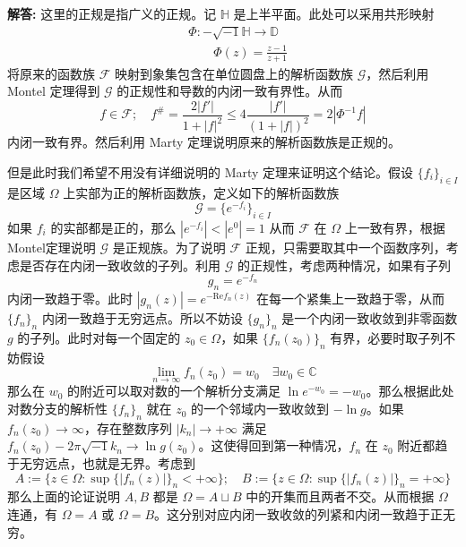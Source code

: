 \documentclass[12pt, a4paper, oneside]{ctexart}
\newcommand{\C}{\mathbb{C}}
\newcommand{\re}{\mathrm{Re}}
\newenvironment{solution}{\par\noindent\textbf{解答:}}{\par}
\begin{document}
\begin{solution}
    这里的正规是指广义的正规。记 $\mathbb{H}$ 是上半平面。此处可以采用共形映射
    \begin{align*}
        &   \Phi:-\sqrt{-1}\mathbb{H} \to \mathbb{D}\\
        &   \qquad \Phi(z) = \frac{z-1}{z+1}
    \end{align*}
    将原来的函数族 $\mathcal{F}$ 映射到象集包含在单位圆盘上的解析函数族 $\mathcal{G}$，然后利用 Montel 定理得到 $\mathcal{G}$ 的正规性和导数的内闭一致有界性。从而
    \begin{equation*}
        f \in \mathcal{F};\quad f^{\#} = \frac{2|f'|}{1+|f|^{2}} \le 4\frac{|f'|}{(1+|f|)^{2}} = 2|\Phi^{-1}f|
    \end{equation*}
    内闭一致有界。然后利用 Marty 定理说明原来的解析函数族是正规的。

    但是此时我们希望不用没有详细说明的 Marty 定理来证明这个结论。假设 $\{f_{i}\}_{i\in I}$ 是区域 $\Omega$ 上实部为正的解析函数族，定义如下的解析函数族
    \begin{equation*}
        \mathcal{G} = \{e^{-f_{i}}\}_{i\in I}
    \end{equation*}
    如果 $f_{i}$ 的实部都是正的，那么 $|e^{-f_{i}}| < |e^{0}| = 1$ 从而 $\mathcal{F}$ 在 $\Omega$ 上一致有界，根据Montel定理说明 $\mathcal{G}$ 是正规族。为了说明 $\mathcal{F}$ 正规，只需要取其中一个函数序列，考虑是否存在内闭一致收敛的子列。利用 $\mathcal{G}$ 的正规性，考虑两种情况，如果有子列
    \begin{equation*}
        g_{n} = e^{-f_{n}}
    \end{equation*}
    内闭一致趋于零。此时 $|g_{n}(z)| = e^{-\re f_{n}(z)}$ 在每一个紧集上一致趋于零，从而 $\{f_{n}\}_{n}$ 内闭一致趋于无穷远点。所以不妨设 $\{g_{n}\}_{n}$ 是一个内闭一致收敛到非零函数 $g$ 的子列。此时对每一个固定的 $z_{0}\in \Omega$，如果 $\{f_{n}(z_{0})\}_{n}$ 有界，必要时取子列不妨假设
    \begin{equation*}
        \lim_{n\to\infty}f_{n}(z_{0}) = w_{0} \quad \exists w_{0} \in \C
    \end{equation*}
    那么在 $w_{0}$ 的附近可以取对数的一个解析分支满足 $\ln e^{-w_{0}} = -w_{0}$。那么根据此处对数分支的解析性 $\{f_{n}\}_{n}$ 就在 $z_{0}$ 的一个邻域内一致收敛到 $-\ln g$。如果 $f_{n}(z_{0}) \to \infty$，存在整数序列 $|k_{n}| \to +\infty$ 满足 $f_{n}(z_{0})-2\pi\sqrt{-1}k_{n} \to \ln g(z_{0})$。这使得回到第一种情况，$f_{n}$ 在 $z_{0}$ 附近都趋于无穷远点，也就是无界。考虑到
    \begin{equation*}
        A := \{z\in \Omega:\sup\{|f_{n}(z)|\}_{n} <+\infty\};\quad B := \{z\in \Omega:\sup\{|f_{n}(z)|\}_{n}=+\infty\}
    \end{equation*}
    那么上面的论证说明 $A,B$ 都是 $\Omega = A \sqcup B$ 中的开集而且两者不交。从而根据 $\Omega$ 连通，有 $\Omega = A$ 或 $\Omega = B$。这分别对应内闭一致收敛的列紧和内闭一致趋于正无穷。
\end{solution}
\end{document}

